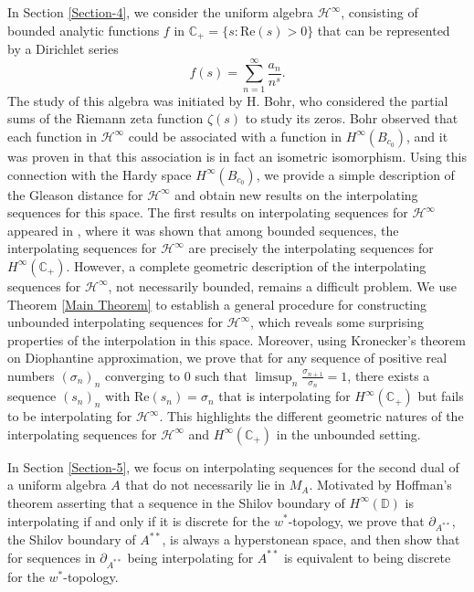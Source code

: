 \documentclass[preprint,12pt,number]{elsarticle}
\begin{document}
In Section \ref{Section-4}, we consider the uniform algebra $\mathscr{H}^\infty$, consisting of bounded analytic functions $f$ in $\mathbb{C}_+=\{s:\text{Re}(s)>0\}$ that can be represented by a Dirichlet series$$f(s)=\sum_{n=1}^\infty \frac{a_n}{n^s}.$$The study of this algebra was initiated by H. Bohr, who considered the partial sums of the Riemann zeta function $\zeta(s)$ to study its zeros. Bohr observed that each function in $\mathscr{H}^\infty$ could be associated with a function in $H^\infty(B_{c_0})$, and it was proven in \cite{HedenmalmLindqvistSeip1997} that this association is in fact an isometric isomorphism. Using this connection with the Hardy space $H^\infty(B_{c_0})$, we provide a simple description of the Gleason distance for $\mathscr{H}^\infty$ and obtain new results on the interpolating sequences for this space. The first results on interpolating sequences for $\mathscr{H}^\infty$ appeared in \cite{seip2009interpolation}, where it was shown that among bounded sequences, the interpolating sequences for $\mathscr{H}^\infty$ are precisely the interpolating sequences for $H^\infty(\mathbb{C}_+)$. However, a complete geometric description of the interpolating sequences for $\mathscr{H}^\infty$, not necessarily bounded, remains a difficult problem. We use Theorem \ref{Main Theorem} to establish a general procedure for constructing unbounded interpolating sequences for $\mathscr{H}^\infty$, which reveals some surprising properties of the interpolation in this space. Moreover, using Kronecker's theorem on Diophantine approximation, we prove that for any sequence of positive real numbers $(\sigma_n)_n$ converging to $0$ such that $\limsup_n\frac{\sigma_{n+1}}{\sigma_n}=1$, there exists a sequence $(s_n)_n$ with $\text{Re}(s_n)=\sigma_n$ that is interpolating for $H^\infty(\mathbb{C}_+)$ but fails to be interpolating for $\mathscr{H}^{\infty}$. This highlights the different geometric natures of the interpolating sequences for $\mathscr{H}^{\infty}$ and $H^\infty(\mathbb{C}_+)$ in the unbounded setting.

In Section \ref{Section-5}, we focus on interpolating sequences for the second dual of a uniform algebra $A^{}$ that do not necessarily lie in $M_A$. Motivated by Hoffman's theorem asserting that a sequence in the Shilov boundary of $H^\infty(\mathbb{D})$ is interpolating if and only if it is discrete for the $w^*$-topology, we prove that $\partial_{A^{**}}$, the Shilov boundary of $A^{**}$, is always a hyperstonean space, and then show that for sequences in $\partial_{A^{**}}$ being interpolating for $A^{**}$ is equivalent to being discrete for the $w^*$-topology.
\end{document}

